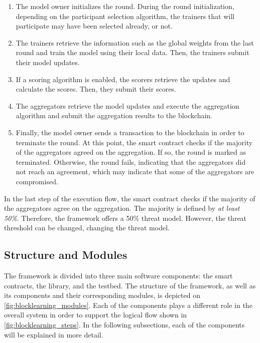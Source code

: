 \begin{enumerate}
    \item The model owner initializes the round. During the round initialization, depending on the participant selection algorithm, the trainers that will participate may have been selected already, or not.
    
    \item The trainers retrieve the information such as the global weights from the last round and train the model using their local data. Then, the trainers submit their model updates.
    
    \item If a scoring algorithm is enabled, the scorers retrieve the updates and calculate the scores. Then, they submit their scores.
    
    \item The aggregators retrieve the model updates and execute the aggregation algorithm and submit the aggregation results to the blockchain.
    
    \item Finally, the model owner sends a transaction to the blockchain in order to terminate the round. At this point, the smart contract checks if the majority of the aggregators agreed on the aggregation. If so, the round is marked as terminated. Otherwise, the round fails, indicating that the aggregators did not reach an agreement, which may indicate that some of the aggregators are compromised.
\end{enumerate}

In the last step of the execution flow, the smart contract checks if the majority of the aggregators agree on the aggregation. The majority is defined by \textit{at least 50\%}. Therefore, the framework offers a 50\% threat model. However, the threat threshold can be changed, changing the threat model.

\subsection{Structure and Modules}\label{meth:struct_modules}

The framework is divided into three main software components: the smart contracts, the library, and the testbed. The structure of the framework, as well as its components and their corresponding modules, is depicted on \autoref{fig:blocklearning_modules}. Each of the components plays a different role in the overall system in order to support the logical flow shown in \autoref{fig:blocklearning_steps}. In the following subsections, each of the components will be explained in more detail.

